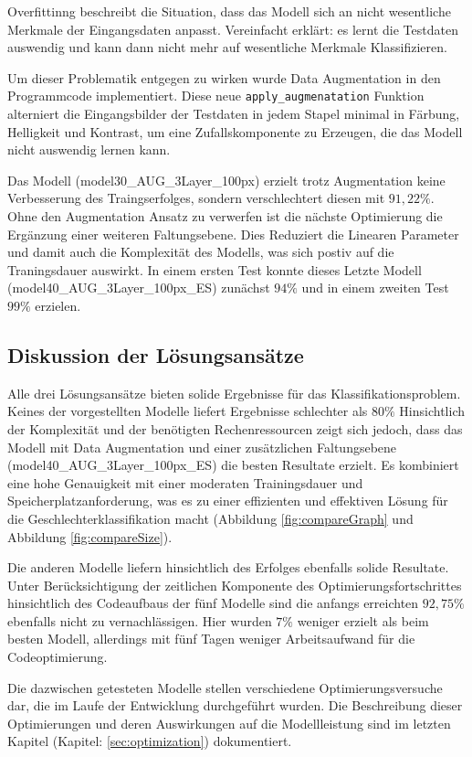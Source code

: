 \documentclass[journal,twoside,web]{ieeecolor}
\begin{document}
Overfittinng beschreibt die Situation, dass das Modell sich an nicht wesentliche Merkmale der Eingangsdaten anpasst. Vereinfacht erklärt: es lernt die Testdaten auswendig und kann dann nicht mehr auf wesentliche Merkmale Klassifizieren.

Um dieser Problematik entgegen zu wirken wurde Data Augmentation in den Programmcode implementiert. 
Diese neue \texttt{apply\_augmenatation} Funktion alterniert die Eingangsbilder der Testdaten in jedem Stapel minimal in Färbung, Helligkeit und Kontrast, um eine Zufallskomponente zu Erzeugen, die das Modell nicht auswendig lernen kann. 

Das Modell (model30\_AUG\_3Layer\_100px) erzielt trotz Augmentation keine Verbesserung des Traingserfolges, sondern verschlechtert diesen mit $91,22\%$. 
Ohne den Augmentation Ansatz zu verwerfen ist die nächste Optimierung die Ergänzung einer weiteren Faltungsebene. 
Dies Reduziert die Linearen Parameter und damit auch die Komplexität des Modells, was sich postiv auf die Traningsdauer auswirkt. 
In einem ersten Test konnte dieses Letzte Modell (model40\_AUG\_3Layer\_100px\_ES) zunächst $94\%$ und in einem zweiten Test $99\%$ erzielen.

\subsection{Diskussion der Lösungsansätze}
Alle drei Lösungsansätze bieten solide Ergebnisse für das Klassifikationsproblem. Keines der vorgestellten Modelle liefert Ergebnisse schlechter als $80\%$ Hinsichtlich der Komplexität und der benötigten Rechenressourcen zeigt sich jedoch, dass das Modell mit Data Augmentation und einer zusätzlichen Faltungsebene (model40\_AUG\_3Layer\_100px\_ES) die besten Resultate erzielt. Es kombiniert eine hohe Genauigkeit mit einer moderaten Trainingsdauer und Speicherplatzanforderung, was es zu einer effizienten und effektiven Lösung für die Geschlechterklassifikation macht (Abbildung \ref{fig:compareGraph} und Abbildung \ref{fig:compareSize}).

Die anderen Modelle liefern hinsichtlich des Erfolges ebenfalls solide Resultate. 
Unter Berücksichtigung der zeitlichen Komponente des Optimierungsfortschrittes hinsichtlich des Codeaufbaus der fünf Modelle sind die anfangs erreichten $92,75\%$ ebenfalls nicht zu vernachlässigen. Hier wurden $7\%$ weniger erzielt als beim besten Modell, allerdings mit fünf Tagen weniger Arbeitsaufwand für die Codeoptimierung. 

Die dazwischen getesteten Modelle stellen verschiedene Optimierungsversuche dar, die im Laufe der Entwicklung durchgeführt wurden. Die Beschreibung dieser Optimierungen und deren Auswirkungen auf die Modellleistung sind im letzten Kapitel (Kapitel: \ref{sec:optimization}) dokumentiert.
\end{document}
